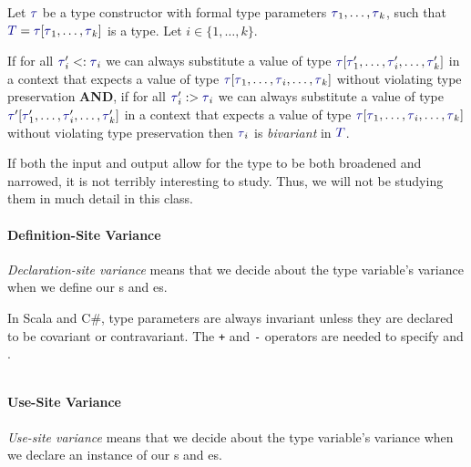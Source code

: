 \begin{definition}[Bivariance]\label{def:Type_Bivariance}
  Let $\DataType$ be a type constructor with formal type parameters $\DataType_{1}, \ldots , \DataType_{k}$, such that $\SemanticType{T} = \DataType [\DataType_{1}, \ldots, \DataType_{k}]$ is a type.
  Let $i \in \lbrace 1,\ldots, k \rbrace$.

  If for all $\DataType_{i}' <: \DataType_{i}$ we can always substitute a value of type $\DataType [\DataType_{1}',\ldots, \DataType_{i}', \ldots, \DataType_{k}']$ in a context that expects a value of type $\DataType [\DataType_{1}, \ldots, \DataType_{i}, \ldots, \DataType_{k}]$ without violating type preservation \textbf{AND}, if for all $\DataType_{i}' :> \DataType_{i}$ we can always substitute a value of type $\DataType' [\DataType_{1}', \ldots, \DataType_{i}', \ldots, \DataType_{k}']$ in a context that expects a value of type $\DataType [\DataType_{1}, \ldots, \DataType_{i}, \ldots, \DataType_{k}]$ without violating type preservation then $\DataType_{i}$ is \emph{bivariant} in $\SemanticType{T}$.

  \begin{remark}
    If both the input and output allow for the type to be both broadened and narrowed, it is not terribly interesting to study.
    Thus, we will not be studying them in much detail in this class.
  \end{remark}
\end{definition}

\paragraph{Definition-Site Variance}\label{par:Definition_Site_Variance}
\begin{definition}\label{def:Definition_Site_Variance}
  \emph{Declaration-site variance} means that we decide about the type variable's variance when we define our s and es.
\end{definition}

In Scala and C\#, type parameters are always invariant unless they are declared to be covariant or contravariant.
The \texttt{+} and \texttt{-} operators are needed to specify  and .
\inputminted[frame=lines,linenos]{scala}{./EDAP05-Concepts_Programming_Languages-Sections/Advanced_Data_Types/Code/Definition_Site_Variance.scala}

\paragraph{Use-Site Variance}\label{par:Use_Site_Variance}
\begin{definition}\label{def:Use_Site_Variance}
  \emph{Use-site variance} means that we decide about the type variable's variance when we declare an instance of our s and es.
\end{definition}

